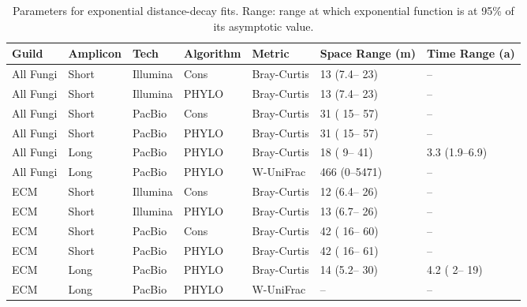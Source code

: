 \documentclass[
]{article}
\begin{document}
\begin{table}

\caption{\label{tab:variofit}Parameters for exponential distance-decay fits. Range: range at which exponential function is at 95\% of its asymptotic value.}
\centering
\begin{tabular}[t]{lllllll}
\toprule
Guild & Amplicon & Tech & Algorithm & Metric & Space Range (m) & Time Range (a)\\
\midrule
All Fungi & Short & Illumina & Cons & Bray-Curtis & 13 (7.4– 23) & --\\
All Fungi & Short & Illumina & PHYLO & Bray-Curtis & 13 (7.4– 23) & --\\
All Fungi & Short & PacBio & Cons & Bray-Curtis & 31 ( 15– 57) & --\\
All Fungi & Short & PacBio & PHYLO & Bray-Curtis & 31 ( 15– 57) & --\\
All Fungi & Long & PacBio & PHYLO & Bray-Curtis & 18 (  9– 41) & 3.3 (1.9–6.9)\\
All Fungi & Long & PacBio & PHYLO & W-UniFrac & 466 (0–5471) & --\\
\addlinespace
ECM & Short & Illumina & Cons & Bray-Curtis & 12 (6.4– 26) & --\\
ECM & Short & Illumina & PHYLO & Bray-Curtis & 13 (6.7– 26) & --\\
ECM & Short & PacBio & Cons & Bray-Curtis & 42 ( 16– 60) & --\\
ECM & Short & PacBio & PHYLO & Bray-Curtis & 42 ( 16– 61) & --\\
ECM & Long & PacBio & PHYLO & Bray-Curtis & 14 (5.2– 30) & 4.2 (  2– 19)\\
ECM & Long & PacBio & PHYLO & W-UniFrac & -- & --\\
\bottomrule
\end{tabular}
\end{table}

\FloatBarrier
\end{document}
